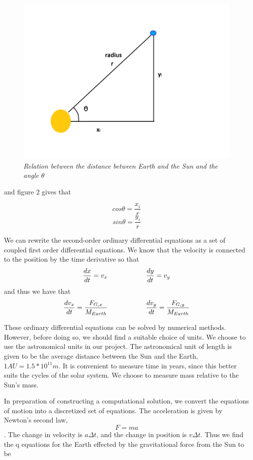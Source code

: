 \documentclass[a4paper,12pt, english]{article}
\begin{document}
\begin{figure}[h!]
  \centering
    \includegraphics[scale=0.2]{project3_1.png}
  \caption{\textit{Relation between the distance between Earth and the Sun and the angle $\theta$}}
\end{figure}

and figure 2 gives that

$$ cos \theta = \frac{x_i}{r} $$
$$ sin \theta = \frac{y_i}{r} $$

We can rewrite the second-order ordinary differential equations as a set of coupled first order differential equations. 
We know that the velocity is connected to the position by the time derivative so that
$$ \frac{dx}{dt} = v_x \hspace{20 mm} \frac{dy}{dt} = v_y$$
and thus we have that
$$ \frac{dv_x}{dt} = \frac{F_{G,x}}{M_{Earth}} \hspace{20 mm} \frac{dv_y}{dt} = \frac{F_{G,y}}{M_{Earth}} $$

These ordinary differential equations can be solved by numerical methods. However, before doing so, we should find a suitable choice of units. We choose to use the astronomical units in our project. The astronomical unit of length is given to be the average distance between the Sun and the Earth, $1 AU = 1.5*10^{11} m$. It is convenient to measure time in years, since this better suits the cycles of the solar system. We choose to measure mass relative to the Sun's mass.

In preparation of constructing a computational solution, we convert the equations of motion into a discretized set of equations. The acceleration is given by Newton's second law, $$ F = ma $$. The change in velocity is $a \Delta t$, and the change in position is $v \Delta t$. Thus we find the q
equations for the Earth effected by the gravitational force from the Sun to be
\end{document}
